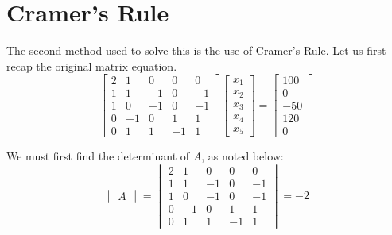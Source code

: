 \documentclass[paper.tex]{subfiles}
\begin{document}
\section{Cramer's Rule}

The second method used to solve this is the use of Cramer's Rule.
Let us first recap the original matrix equation.
\begin{equation*}
    \begin{bmatrix}
        2 & 1 & 0 & 0 & 0   \\
        1 & 1 & -1 & 0 & -1 \\
        1 & 0 & -1 & 0 & -1 \\
        0 & -1 & 0 & 1 & 1  \\
        0 & 1 & 1 & -1 & 1 
    \end{bmatrix}
    \begin{bmatrix}
        x_1 \\
        x_2 \\
        x_3 \\
        x_4 \\
        x_5
    \end{bmatrix}
    =
    \begin{bmatrix}
        100 \\
        0 \\
        -50 \\
        120 \\
        0
    \end{bmatrix}
\end{equation*}

We must first find the determinant of $A$, as noted below:
\begin{equation*}
    \begin{vmatrix}
        A
    \end{vmatrix}
    = \begin{vmatrix}
        2 & 1 & 0 & 0 & 0   \\
        1 & 1 & -1 & 0 & -1 \\
        1 & 0 & -1 & 0 & -1 \\
        0 & -1 & 0 & 1 & 1  \\
        0 & 1 & 1 & -1 & 1 
    \end{vmatrix}
    = -2
\end{equation*}
\end{document}
